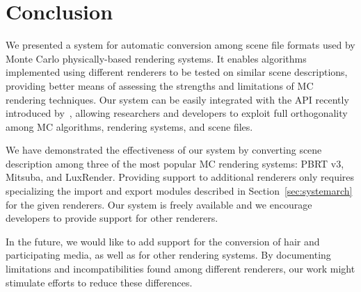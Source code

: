 \section{Conclusion}
\label{sec:conclusion}
We presented a system for automatic conversion among scene file formats used by Monte Carlo physically-based rendering systems. 
It enables algorithms implemented using different renderers to be tested on similar scene descriptions, providing better means of assessing the strengths and limitations of MC rendering techniques. 
%
Our system can be easily integrated with the API recently introduced by~\cite{Santos:2018:FBKSD}, allowing researchers and developers to exploit full orthogonality among MC algorithms, rendering systems, and scene files.   

We have demonstrated the effectiveness of our system by converting scene description among three of the most popular MC rendering systems: PBRT v3, Mitsuba, and LuxRender. Providing support to additional renderers only requires specializing the import and export modules described in Section~\ref{sec:systemarch} for the given renderers. Our system is freely available and we encourage developers to provide support for other renderers.  

In the future, we would like to add support for the conversion of hair and participating media, as well as for other rendering systems.
By documenting limitations and incompatibilities found among different renderers, our work might stimulate efforts to reduce these differences.   
